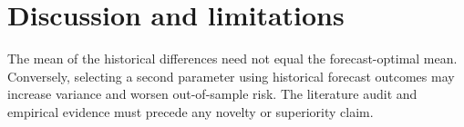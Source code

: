 \section{Discussion and limitations}
The mean of the historical differences need not equal the
forecast-optimal mean. Conversely, selecting a second parameter
using historical forecast outcomes may increase variance and
worsen out-of-sample risk. The literature audit and empirical
evidence must precede any novelty or superiority claim.
